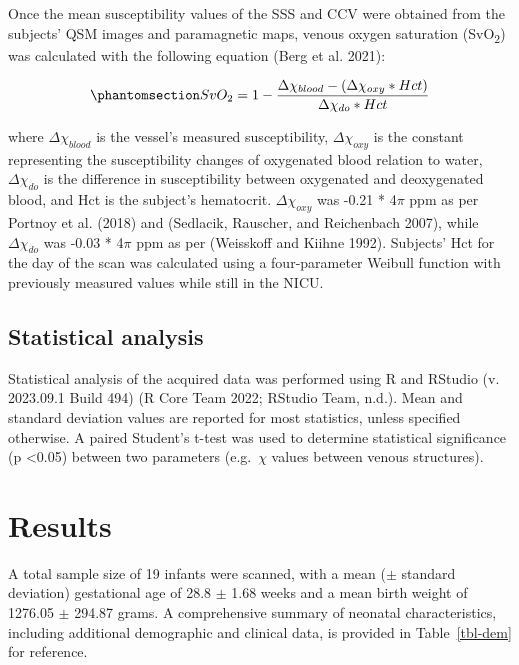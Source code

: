 \documentclass[
sn-nature
]{sn-jnl}
\begin{document}
Once the mean susceptibility values of the SSS and CCV were obtained
from the subjects' QSM images and paramagnetic maps, venous oxygen
saturation (SvO\textsubscript{2}) was calculated with the following
equation (Berg et al. 2021):

\begin{equation}\phantomsection\label{eq-svo}{
SvO_{2} = 1 - \frac{\Delta \chi _{blood} - (\Delta \chi _{oxy} * Hct)}{\Delta \chi _{do} * Hct}
}\end{equation}

where \(\Delta \chi _{blood}\) is the vessel's measured susceptibility,
\(\Delta \chi _{oxy}\) is the constant representing the susceptibility
changes of oxygenated blood relation to water, \(\Delta \chi _{do}\) is
the difference in susceptibility between oxygenated and deoxygenated
blood, and Hct is the subject's hematocrit. \(\Delta \chi _{oxy}\) was
-0.21 * 4\(\pi\) ppm as per Portnoy et al. (2018) and (Sedlacik,
Rauscher, and Reichenbach 2007), while \(\Delta \chi _{do}\) was -0.03 *
4\(\pi\) ppm as per (Weisskoff and Kiihne 1992). Subjects' Hct for the
day of the scan was calculated using a four-parameter Weibull function
with previously measured values while still in the NICU.

\subsection{Statistical analysis}\label{statistical-analysis}

Statistical analysis of the acquired data was performed using R and
RStudio (v. 2023.09.1 Build 494) (R Core Team 2022; RStudio Team, n.d.).
Mean and standard deviation values are reported for most statistics,
unless specified otherwise. A paired Student's t-test was used to
determine statistical significance (p \textless0.05) between two
parameters (e.g.~\(\chi\) values between venous structures).

\section{Results}\label{sec-results}

A total sample size of 19 infants were scanned, with a mean (\(\pm\)
standard deviation) gestational age of 28.8 \(\pm\) 1.68 weeks and a
mean birth weight of 1276.05 \(\pm\) 294.87 grams. A comprehensive
summary of neonatal characteristics, including additional demographic
and clinical data, is provided in Table~\ref{tbl-dem} for reference.
\end{document}
